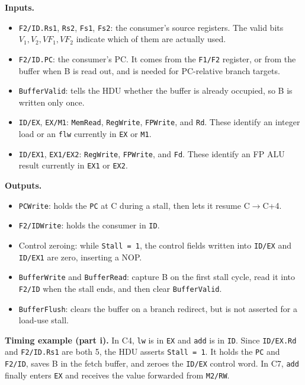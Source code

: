 \documentclass[11pt, a4paper]{article}
\begin{document}
\textbf{Inputs.}
\begin{itemize}[noitemsep, topsep=2pt]
    \item \texttt{F2/ID.Rs1}, \texttt{Rs2}, \texttt{Fs1}, \texttt{Fs2}: the consumer's source registers. The valid bits $V_1,V_2,VF_1,VF_2$ indicate which of them are actually used.
    \item \texttt{F2/ID.PC}: the consumer's PC. It comes from the \texttt{F1/F2} register, or from the buffer when B is read out, and is needed for PC-relative branch targets.
    \item \texttt{BufferValid}: tells the HDU whether the buffer is already occupied, so B is written only once.
    \item \texttt{ID/EX}, \texttt{EX/M1}: \texttt{MemRead}, \texttt{RegWrite}, \texttt{FPWrite}, and \texttt{Rd}. These identify an integer load or an \texttt{flw} currently in \texttt{EX} or \texttt{M1}.
    \item \texttt{ID/EX1}, \texttt{EX1/EX2}: \texttt{RegWrite}, \texttt{FPWrite}, and \texttt{Fd}. These identify an FP ALU result currently in \texttt{EX1} or \texttt{EX2}.
\end{itemize}

\textbf{Outputs.}
\begin{itemize}[noitemsep, topsep=2pt]
    \item \texttt{PCWrite}: holds the \texttt{PC} at C during a stall, then lets it resume C$\rightarrow$C+4.
    \item \texttt{F2/IDWrite}: holds the consumer in \texttt{ID}.
    \item Control zeroing: while \texttt{Stall = 1}, the control fields written into \texttt{ID/EX} and \texttt{ID/EX1} are zero, inserting a NOP.
    \item \texttt{BufferWrite} and \texttt{BufferRead}: capture B on the first stall cycle, read it into \texttt{F2/ID} when the stall ends, and then clear \texttt{BufferValid}.
    \item \texttt{BufferFlush}: clears the buffer on a branch redirect, but is not asserted for a load-use stall.
\end{itemize}

\textbf{Timing example (part i).} In C4, \texttt{lw} is in \texttt{EX} and \texttt{add} is in \texttt{ID}. Since \texttt{ID/EX.Rd} and \texttt{F2/ID.Rs1} are both 5, the HDU asserts \texttt{Stall = 1}. It holds the \texttt{PC} and \texttt{F2/ID}, saves B in the fetch buffer, and zeroes the \texttt{ID/EX} control word. In C7, \texttt{add} finally enters \texttt{EX} and receives the value forwarded from \texttt{M2/RW}.
\end{document}
